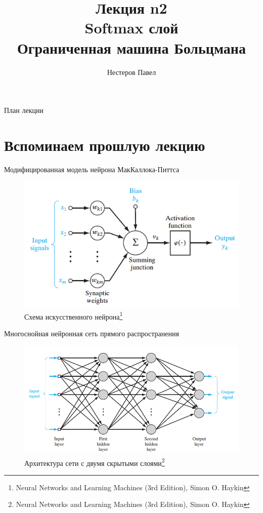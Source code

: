 \documentclass[10pt]{beamer}
\author{Нестеров Павел}
\title{\newline \newline \newline Лекция n2 \\ Softmax слой \\ Ограниченная машина Больцмана}
\let\otp\titlepage
\renewcommand{\titlepage}{\otp\addtocounter{framenumber}{-1}}
\begin{document}
\begin{frame}[plain]
\titlepage
\end{frame}

\begin{frame}{План лекции}
\tableofcontents
\end{frame}


\section{Вспоминаем прошлую лекцию}

\begin{frame}{Модифицированная модель нейрона МакКаллока-Питтса}

\begin{figure}[h!]
  \centering
  \includegraphics[width=1\textwidth]{images/neuron_mod.png}
  \caption{Схема искусственного нейрона\footnote{Neural Networks and Learning Machines (3rd Edition), Simon O. Haykin}}
\end{figure}

\end{frame}

\begin{frame}{Многоснойная нейронная сеть прямого распространения}

\begin{figure}[h!]
  \centering
  \includegraphics[width=1\textwidth]{images/mlp.png}
  \caption{Архитектура сети с двумя скрытыми слоями\footnote{Neural Networks and Learning Machines (3rd Edition), Simon O. Haykin}}
\end{figure}

\end{frame}
\end{document}
